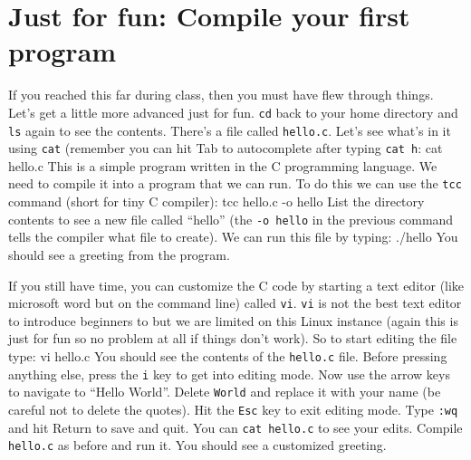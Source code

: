 \documentclass[12pt]{article}
\newenvironment{cmd}{\verbatim}{\endverbatim\vspace{3pt}}
\begin{document}
\section{Just for fun: Compile your first program}
If you reached this far during class, then you must have flew through things. Let's get a little more advanced just for fun.  \texttt{cd} back to your home directory and \texttt{ls} again to see the contents. There's a file called \texttt{hello.c}. Let's see what's in it using \texttt{cat} (remember you can hit Tab to autocomplete after typing \texttt{cat h}:
\begin{cmd}
  cat hello.c
\end{cmd}
This is a simple program written in the C programming language. We need to compile it into a program that we can run. To do this we can use the \texttt{tcc} command (short for tiny C compiler):
\begin{cmd}
  tcc hello.c -o hello
\end{cmd}
List the directory contents to see a new file called ``hello'' (the \texttt{-o hello} in the previous command tells the compiler what file to create). We can run this file by typing:
\begin{cmd}
  ./hello
\end{cmd}
You should see a greeting from the program.

If you still have time, you can customize the C code by starting a text editor (like microsoft word but on the command line) called \texttt{vi}. \texttt{vi} is not the best text editor to introduce beginners to but we are limited on this Linux instance (again this is just for fun so no problem at all if things don't work). So to start editing the file type:
\begin{cmd}
  vi hello.c
\end{cmd}
You should see the contents of the \texttt{hello.c} file. Before pressing anything else, press the \texttt{i} key to get into editing mode. Now use the arrow keys to navigate to ``Hello World''. Delete \texttt{World} and replace it with your name (be careful not to delete the quotes). Hit the \texttt{Esc} key to exit editing mode. Type \texttt{:wq} and hit Return to save and quit. You can \texttt{cat hello.c} to see your edits. Compile \texttt{hello.c} as before and run it. You should see a customized greeting.
\end{document}
